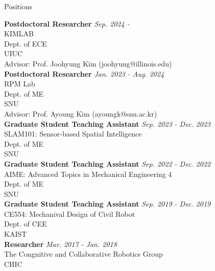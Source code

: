 \begin{rSection}{Positions}

{\bf Postdoctoral Researcher} \hfill {\em Sep. 2024 -} \\
\acf{KIMLAB} \\ 
Dept. of \acf{ECE} \\
\acf{UIUC}\\
Advisor: Prof. Joohyung Kim (joohyung@illinois.edu) \\

{\bf Postdoctoral Researcher} \hfill {\em Jan. 2023 - Aug. 2024} \\
\acf{RPM} Lab \\ 
Dept. of \acf{ME} \\
\acf{SNU}\\
Advisor: Prof. Ayoung Kim (ayoungk@snu.ac.kr) \\

{\bf Graduate Student Teaching Assistant} \hfill {\em Sep. 2023 - Dec. 2023} \\
SLAM101: Sensor-based Spatial Intelligence \\ 
Dept. of \acf{ME} \\
\acf{SNU}\\


{\bf Graduate Student Teaching Assistant} \hfill {\em Sep. 2022 - Dec. 2022} \\
AIME: Advanced Topics in Mechanical Engineering 4 \\ 
Dept. of \acf{ME} \\
\acf{SNU}\\

{\bf Graduate Student Teaching Assistant} \hfill {\em Sep. 2019 - Dec. 2019} \\
CE554: Mechanival Design of Civil Robot \\ 
Dept. of \acf{CEE} \\
\acf{KAIST}\\

{\bf Researcher} \hfill {\em Mar. 2017 - Jan. 2018} \\
The Congnitive and Collaborative Robotics Group\\
\acf{CHIC}\\


\end{rSection}


